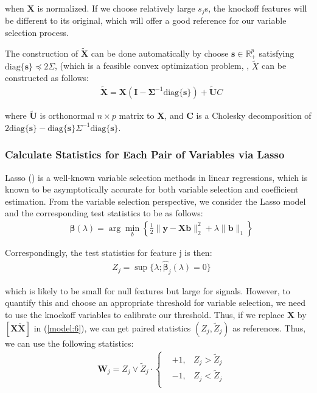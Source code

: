 \documentclass{uwstat572}
\newcommand\diag{\text{diag}}
\begin{document}
when $\bm{X}$ is normalized. If we choose relatively large $s_j$s, the knockoff features will be different to its original, which will offer a good reference for our variable selection process. 

The construction of $\bm{\tilde X}$ can be done automatically by choose $\bm{s}\in\mathbb{R}_+^p$ satisfying $\diag\{\bm{s} \}\preceq 2\Sigma$, (which is a feasible convex optimization problem, \cite{boyd2004convex}, $\tilde{X}$ can be constructed as follows:
\begin{align}\label{eq:5}
& \tilde{\bm{X}} = \bm{X}(\bm{I}- \bm{\Sigma}^{-1}\text{diag}\{\bm{s} \}) + \bm{\tilde U}C 
\end{align}

where $\tilde{\bm{U}}$ is orthonormal $n\times p$ matrix to $\bm{X}$, and $\bm{C}$ is a Cholesky decomposition of $2\diag\{\bm{s}\} - \diag\{\bm{s}\} \Sigma^{-1} \diag\{\bm{s}\}$.

\subsubsection{Calculate Statistics for Each Pair of Variables via Lasso}
Lasso (\cite{tibshirani1996regression}) is a well-known variable selection methods in linear regressions, which is known to be asymptotically accurate for both variable selection and coefficient estimation. From the variable selection perspective, we consider the Lasso model and the corresponding test statistics to be as follows:
\begin{align}\label{model:6}
& \hat{\bm{\beta}}(\lambda) = \arg\min_b \left\{\frac{1}{2}\|\bm{y} - \bm{X}\bm{b} \|_2^2 + \lambda\|\bm{b}\|_1 \right\}
\end{align}

Correspondingly, the test statistics for feature j is then:
\begin{align}
& Z_j = \sup\{\lambda; \hat{\bm{\beta}}_j(\lambda)=0 \}
\end{align}

which is likely to be small for null features but large for signals.
However, to quantify this and choose an appropriate threshold for variable selection, we need to use the knockoff variables to calibrate our threshold. Thus, if we replace $\bm{X}$ by $[\bm{X} \bm{\tilde{X}}]$ in (\ref{model:6}), we can get paired statistics $(Z_j, \tilde{Z}_j)$ as references. Thus, we can use the following statistics:
\begin{align}\label{eq:8}
& \bm{W}_j = Z_j\vee \tilde{Z}_j \cdot \left\{\begin{aligned}
& +1, & 	Z_j > \tilde{Z}_j\\ & -1, & 	Z_j < \tilde{Z}_j\\ 
\end{aligned} \right.
\end{align}
\end{document}
